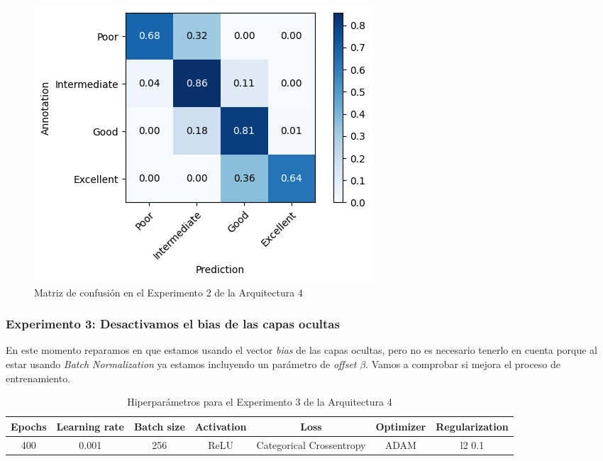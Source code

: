 \documentclass{article}
\begin{document}
			\begin{figure}[!h]
				\begin{center}
					\includegraphics[scale=0.7]{d-cm-a4-e2.png}		
					\caption{Matriz de confusi\'on en el Experimento 2 de la Arquitectura 4}	
					\label{d-cm-a4-e2}
				\end{center}
			\end{figure}
			
		\subsubsection{Experimento 3: Desactivamos el bias de las capas ocultas}
		\label{d-s-a4-e3}
			En este momento reparamos en que estamos usando el vector \textit{bias} de las capas ocultas, pero no es necesario tenerlo en cuenta porque al estar usando \textit{Batch Normalization} ya estamos incluyendo un par\'ametro de \textit{offset} $\beta$. Vamos a comprobar si mejora el proceso de entrenamiento.
			
			\begin{table}[!h]
				\begin{tabular}{| c | c | c | c | c | c | c |}
					\textbf{Epochs} & \textbf{Learning rate} & \textbf{Batch size} & \textbf{Activation} & \textbf{Loss} & \textbf{Optimizer} & \textbf{Regularization} \\ \hline
					400 & 0.001 & 256 & ReLU & Categorical Crossentropy & ADAM & l2 0.1
				\end{tabular}
				\caption{Hiperpar\'ametros para el Experimento 3 de la Arquitectura 4}
				\label{tab:hip-d-a4-e3}
			\end{table}
			
\end{document}
